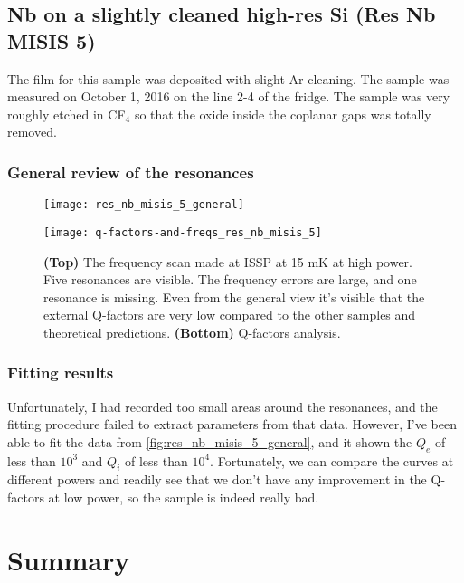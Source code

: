\documentclass[12pt]{article}
\numberwithin{equation}{section}
\numberwithin{figure}{section}
\begin{document}
\subsection{Nb on a slightly cleaned high-res Si (Res Nb MISIS 5)}

The film for this sample was deposited with slight Ar-cleaning. The sample was measured on October 1, 2016 on the line 2-4 of the fridge. The sample was very roughly etched in CF$_4$ so that the oxide inside the coplanar gaps was totally removed.

\subsubsection{General review of the resonances}

\begin{figure}[h!]
\centering
\texttt{[image: res\_nb\_misis\_5\_general]}

\vspace{0.5cm}
\texttt{[image: q-factors-and-freqs\_res\_nb\_misis\_5]}

\caption{\textbf{(Top)} The frequency scan made at ISSP at 15 mK at high power. Five resonances are visible. The frequency errors are large, and one resonance is missing. Even from the general view it's visible that the external Q-factors are very low compared to the other samples and theoretical predictions. \textbf{(Bottom)} Q-factors analysis.}
\label{fig:res_nb_misis_5_general}
\end{figure}

\subsubsection{Fitting results}

Unfortunately, I had recorded too small areas around the resonances, and the fitting procedure failed to extract parameters from that data. However, I've been able to fit the data from \autoref{fig:res_nb_misis_5_general}, and it shown the $Q_e$ of less than $10^3$ and $Q_i$ of less than $10^4$. Fortunately, we can compare the curves at different powers and readily see that we don't have any improvement in the Q-factors at low power, so the sample is indeed really bad.


\newpage

\section{Summary}
\end{document}
